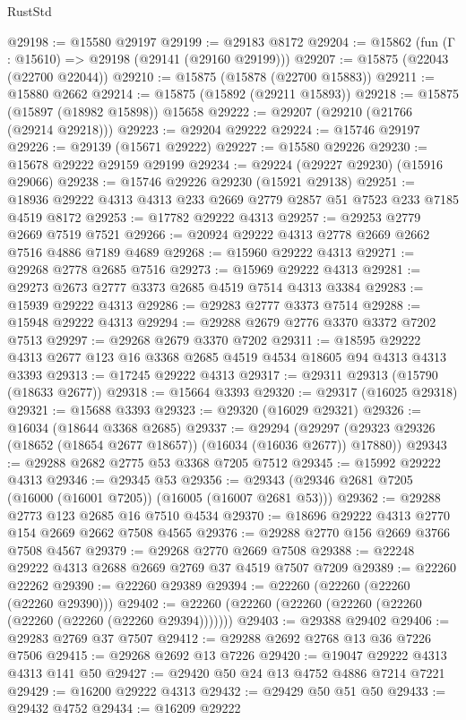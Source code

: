 \begin{lexlean}{RustStd}
\begin{coremodule}
@29198 := @15580 @29197
@29199 := @29183 @8172
@29204 := @15862 (fun (Γ : @15610) => @29198 (@29141 (@29160 @29199)))
@29207 := @15875 (@22043 (@22700 @22044))
@29210 := @15875 (@15878 (@22700 @15883))
@29211 := @15880 @2662
@29214 := @15875 (@15892 (@29211 @15893))
@29218 := @15875 (@15897 (@18982 @15898)) @15658
@29222 := @29207 (@29210 (@21766 (@29214 @29218)))
@29223 := @29204 @29222
@29224 := @15746 @29197
@29226 := @29139 (@15671 @29222)
@29227 := @15580 @29226
@29230 := @15678 @29222 @29159 @29199
@29234 := @29224 (@29227 @29230) (@15916 @29066)
@29238 := @15746 @29226 @29230 (@15921 @29138)
@29251 := @18936 @29222 @4313 @4313 @233 @2669 @2779 @2857 @51 @7523 @233 @7185 @4519 @8172
@29253 := @17782 @29222 @4313
@29257 := @29253 @2779 @2669 @7519 @7521
@29266 := @20924 @29222 @4313 @2778 @2669 @2662 @7516 @4886 @7189 @4689
@29268 := @15960 @29222 @4313
@29271 := @29268 @2778 @2685 @7516
@29273 := @15969 @29222 @4313
@29281 := @29273 @2673 @2777 @3373 @2685 @4519 @7514 @4313 @3384
@29283 := @15939 @29222 @4313
@29286 := @29283 @2777 @3373 @7514
@29288 := @15948 @29222 @4313
@29294 := @29288 @2679 @2776 @3370 @3372 @7202 @7513
@29297 := @29268 @2679 @3370 @7202
@29311 := @18595 @29222 @4313 @2677 @123 @16 @3368 @2685 @4519 @4534 @18605 @94 @4313 @4313 @3393
@29313 := @17245 @29222 @4313
@29317 := @29311 @29313 (@15790 (@18633 @2677))
@29318 := @15664 @3393
@29320 := @29317 (@16025 @29318)
@29321 := @15688 @3393
@29323 := @29320 (@16029 @29321)
@29326 := @16034 (@18644 @3368 @2685)
@29337 := @29294
    (@29297 (@29323 @29326 (@18652 (@18654 @2677 @18657)) (@16034 (@16036 @2677)) @17880))
@29343 := @29288 @2682 @2775 @53 @3368 @7205 @7512
@29345 := @15992 @29222 @4313
@29346 := @29345 @53
@29356 := @29343 (@29346 @2681 @7205 (@16000 (@16001 @7205)) (@16005 (@16007 @2681 @53)))
@29362 := @29288 @2773 @123 @2685 @16 @7510 @4534
@29370 := @18696 @29222 @4313 @2770 @154 @2669 @2662 @7508 @4565
@29376 := @29288 @2770 @156 @2669 @3766 @7508 @4567
@29379 := @29268 @2770 @2669 @7508
@29388 := @22248 @29222 @4313 @2688 @2669 @2769 @37 @4519 @7507 @7209
@29389 := @22260 @22262
@29390 := @22260 @29389
@29394 := @22260 (@22260 (@22260 (@22260 @29390)))
@29402 := @22260 (@22260 (@22260 (@22260 (@22260 (@22260 (@22260 (@22260 @29394)))))))
@29403 := @29388 @29402
@29406 := @29283 @2769 @37 @7507
@29412 := @29288 @2692 @2768 @13 @36 @7226 @7506
@29415 := @29268 @2692 @13 @7226
@29420 := @19047 @29222 @4313 @4313 @141 @50
@29427 := @29420 @50 @24 @13 @4752 @4886 @7214 @7221
@29429 := @16200 @29222 @4313
@29432 := @29429 @50 @51 @50
@29433 := @29432 @4752
@29434 := @16209 @29222

\end{coremodule}
\end{lexlean}

